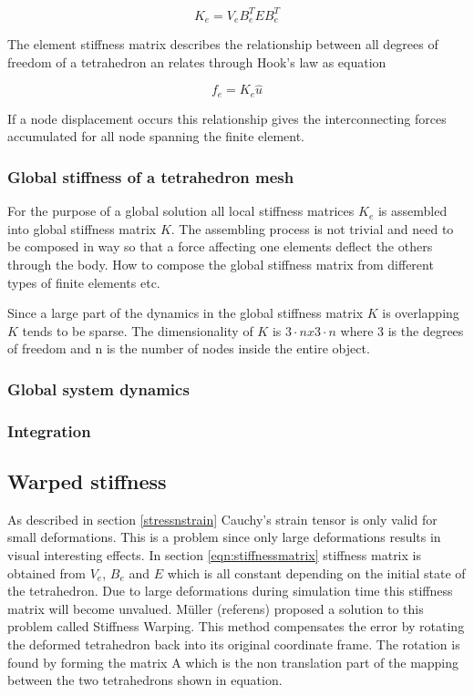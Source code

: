 \documentclass[10pt,a4paper]{article}
\begin{document}
\begin{equation}\label{eqn:stiffnessmatrix}
    K_{e} = V_{e} B_ {e}^{T}EB_ {e}^{T}
\end{equation}

The element stiffness matrix describes the relationship between all degrees of freedom of a tetrahedron an relates through Hook's law as equation

\begin{equation}\label{eqn:stiffnessmatrix}
    f_{e} = K_ {e}\hat{u}
\end{equation}

If a node displacement occurs this relationship gives the interconnecting forces accumulated for all node spanning the finite element.

\subsubsection{Global stiffness of a tetrahedron mesh}
For the purpose of a global solution all local stiffness matrices $K_{e}$ is assembled into global stiffness matrix $K$. The assembling process is not trivial and need to be composed in way so that a force affecting one elements deflect the others through the body. How to compose the global stiffness matrix from different types of finite elements etc.

 Since a large part of the dynamics in the global stiffness matrix $K$ is overlapping $K$ tends to be sparse. The dimensionality of $K$ is $3 \cdot n x 3 \cdot n$ where 3 is the degrees of freedom and n is the number of nodes inside the entire object.

\subsubsection{Global system dynamics}


\subsubsection{Integration}


\subsection{Warped stiffness}
As described in section \ref{stressnstrain} Cauchy’s strain tensor is only valid for small deformations. This is a problem since only large deformations results in visual interesting effects. In section \ref{eqn:stiffnessmatrix} stiffness matrix is obtained from $V_{e}$, $B_{e}$ and $E$ which is all constant depending on the initial state of the tetrahedron. Due to large deformations during simulation time this stiffness matrix will become unvalued. M\"uller (referens) proposed a solution to this problem called Stiffness Warping. This method compensates the error by rotating the deformed tetrahedron back into its original coordinate frame. The rotation is found by forming the matrix A which is the non translation part of the mapping between the two tetrahedrons shown in equation.
\end{document}
